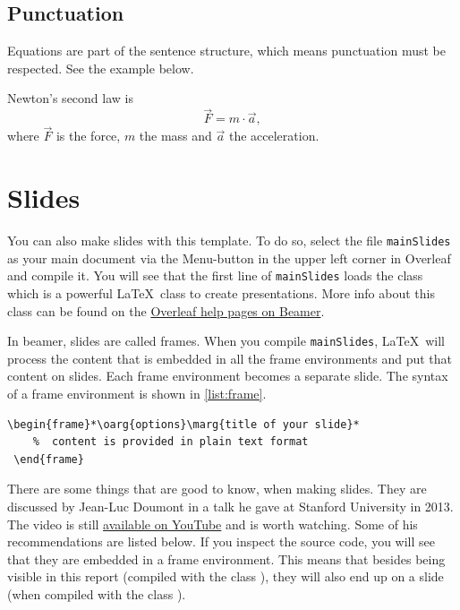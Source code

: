 \subsection{Punctuation}
Equations are part of the sentence structure, which means
punctuation must be respected. See the example below.

Newton's second law is
\begin{equation}\label{eq:newton}
    \vec{F} = m \cdot \vec{a},
\end{equation}
where $\vec{F}$  is the force,  $m$ the mass and $\vec{a}$ the acceleration.

\section{Slides}\label{sec:slides}
You can also make slides with this template. To do so, select the file \texttt{mainSlides} as your main document via the Menu-button in the upper left corner in Overleaf and compile it. You will see that the first line of \texttt{mainSlides} loads the class  which is a powerful \LaTeX\ class to create presentations. More info about this class can be found on the \href{https://www.overleaf.com/learn/latex/Beamer}{Overleaf help pages on Beamer}.

In beamer, slides are called frames. When you compile \texttt{mainSlides}, \LaTeX\ will process the content that is embedded in all the frame environments and put that content on slides. Each frame environment becomes a separate slide. The syntax of a frame environment is shown in \cref{list:frame}.

\begin{lstlisting}[language=latexcode,style=latexstyle,label={list:frame},caption={Syntax of a frame environment}]
 \begin{frame}*\oarg{options}\marg{title of your slide}*
    %  content is provided in plain text format
 \end{frame}
\end{lstlisting}
\mode*


There are some things that are good to know, when making slides. They are discussed by Jean-Luc Doumont in a talk he gave at Stanford University in 2013. The video is still \href{https://youtu.be/meBXuTIPJQk?si=73K4pQiQybXcaqDS}{available on YouTube} and is worth watching. Some of his recommendations are listed below. If you inspect the source code, you will see that they are embedded in a frame environment. This means that besides being visible in this report (compiled with the class ), they will also end up on a slide (when compiled with the class ).

